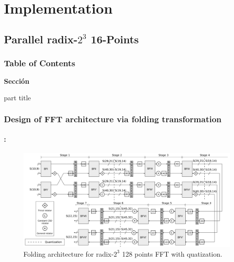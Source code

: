 \section{Implementation}
\subsection{Parallel radix-$2^3$ 16-Points}
\begin{frame}
  \frametitle{\textbf{Table of Contents}}
  \begin{center}
    {\vspace{-1.5cm}\Large \textbf{Sección \thesection}\vspace{0.5cm}}
    \begin{beamercolorbox}[
      sep=8pt,center]{part title}
      \textbf{\insertsection}
    \end{beamercolorbox}
  \end{center}
\end{frame}


\begin{frame}
	\frametitle{\textbf{Design of FFT architecture via folding transformation}}
	\framesubtitle{\secname : \subsecname}
		\begin{figure}[h!] \centering
		   	\includegraphics[width=0.90\paperwidth]{./image/folding-128-quant.png}
		   	\caption{ \tiny Folding architecture for radix-$2^3$  128 points FFT with quatization.}
		\end{figure}  	
\end{frame}


